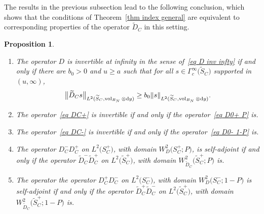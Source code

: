 \documentclass[pdftex]{sigma}%
\numberwithin{equation}{section}
\newtheorem{Proposition}[Theorem]{Proposition}
 { \theoremstyle{definition}
\newtheorem{Definition}[Theorem]{Definition}
\newtheorem{Note}[Theorem]{Note}
\newtheorem{Example}[Theorem]{Example}
\newtheorem{Remark}[Theorem]{Remark} }
\DeclareMathOperator{\vol}{vol}
\begin{document}
The results in the previous subsection lead to the following conclusion, which shows that the conditions of Theorem~\ref{thm index general} are equivalent to corresponding properties of the operator $\widetilde{D}_C$ in this setting.
\begin{Proposition}\label{prop DC D0}\quad
\begin{enumerate}\itemsep=0pt
\item[$(a)$] The operator $D$ is invertible at infinity in the sense of~\eqref{eq D inv infty} if and only if there are $b_0>0$ and $u\geq a$ such that for all $s \in \Gamma^{\infty}_c\big(\widetilde{S}_C\big)$ supported in $(u, \infty)$,
\[
\big\|\widetilde{D}_Cs\big\|_{L^2(\widetilde{S}_C, \vol_{B_N} \otimes {\rm d}y)} \geq b_0 \|s\|_{L^2(\widetilde{S}_C, \vol_{B_N} \otimes {\rm d}y)}.
\]
\item[$(b)$] The operator~\eqref{eq DC+} is invertible if and only if the operator~\eqref{eq D0+ P} is.
\item[$(c)$] The operator~\eqref{eq DC-} is invertible if and only if the operator~\eqref{eq D0- 1-P} is.
\item[$(d)$] The operator $D^-_C D_C^+$ on $L^2\big(S_C^+\big)$, with domain $W^2_D\big(S_C^+; P\big)$, is self-adjoint
 if and only if the operator $\widetilde{D}_C^- \widetilde{D}_C^+$ on $L^2\big(\widetilde{S}_C^+\big)$, with domain $W^2_{\widetilde{D}_C}\big(\widetilde{S}_C^+; P\big)$ is.
\item[$(e)$] The operator
the operator $D^+_C D_C^-$ on $L^2\big(S_C^-\big)$, with domain $W^2_D\big(S_C^-; 1-P\big)$
 is self-adjoint if and only if the operator
 $\widetilde{D}_C^+ \widetilde{D}_C^-$ on $L^2\big(\widetilde{S}_C^+\big)$, with domain $W^2_{\widetilde{D}_C}\big(\widetilde{S}_C^+; 1-P\big)$
 is.
\end{enumerate}
\end{Proposition}
\end{document}
